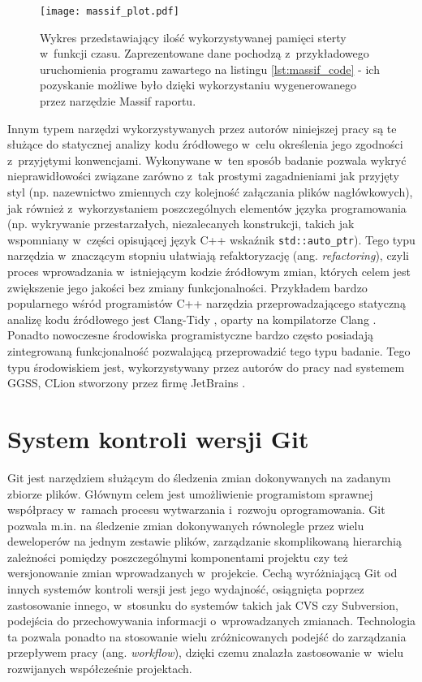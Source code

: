 \begin{figure}[H]
\centering
\texttt{[image: massif\_plot.pdf]}
\caption{Wykres przedstawiający ilość wykorzystywanej pamięci sterty w~funkcji czasu. Zaprezentowane dane pochodzą z~przykładowego uruchomienia programu zawartego na listingu \ref{lst:massif_code} - ich pozyskanie możliwe było dzięki wykorzystaniu wygenerowanego przez narzędzie Massif raportu.}
\label{fig:massif_plot}
\end{figure}

Innym typem narzędzi wykorzystywanych przez autorów niniejszej pracy są te służące do statycznej analizy kodu źródłowego w~celu określenia jego zgodności z~przyjętymi konwencjami. Wykonywane w~ten sposób badanie pozwala wykryć nieprawidłowości związane zarówno z~tak prostymi zagadnieniami jak przyjęty styl (np. nazewnictwo zmiennych czy kolejność załączania plików nagłówkowych), jak również z~wykorzystaniem poszczególnych elementów języka programowania (np. wykrywanie przestarzałych, niezalecanych konstrukcji, takich jak wspomniany w~części opisującej język C++ wskaźnik \lstinline{std::auto_ptr}). Tego typu narzędzia w~znaczącym stopniu ułatwiają refaktoryzację (ang. \emph{refactoring}), czyli proces wprowadzania w~istniejącym kodzie źródłowym zmian, których celem jest zwiększenie jego jakości bez zmiany funkcjonalności. Przykładem bardzo popularnego wśród programistów C++ narzędzia przeprowadzającego statyczną analizę kodu źródłowego jest Clang-Tidy \cite{clang-tidy}, oparty na kompilatorze Clang \cite{clang}. Ponadto nowoczesne środowiska programistyczne bardzo często posiadają zintegrowaną funkcjonalność pozwalającą przeprowadzić tego typu badanie. Tego typu środowiskiem jest, wykorzystywany przez autorów do pracy nad systemem GGSS, CLion stworzony przez firmę JetBrains \cite{clion}.


\section{System kontroli wersji Git}
Git \cite{progit} jest narzędziem służącym do śledzenia zmian dokonywanych na zadanym zbiorze plików. Głównym celem jest umożliwienie programistom sprawnej współpracy w~ramach procesu wytwarzania i~rozwoju oprogramowania. Git pozwala m.in. na śledzenie zmian dokonywanych równolegle przez wielu deweloperów na jednym zestawie plików, zarządzanie skomplikowaną hierarchią zależności pomiędzy poszczególnymi komponentami projektu czy też wersjonowanie zmian wprowadzanych w~projekcie. Cechą wyróżniającą Git od innych systemów kontroli wersji jest jego wydajność, osiągnięta poprzez zastosowanie innego, w~stosunku do systemów takich jak CVS czy Subversion, podejścia do przechowywania informacji o~wprowadzanych zmianach. Technologia ta pozwala ponadto na stosowanie wielu zróżnicowanych podejść do zarządzania przepływem pracy (ang. \emph{workflow}), dzięki czemu znalazła zastosowanie w~wielu rozwijanych współcześnie projektach.


